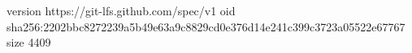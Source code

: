 version https://git-lfs.github.com/spec/v1
oid sha256:2202bbc8272239a5b49e63a9c8829cd0e376d14e241c399c3723a05522e67767
size 4409
